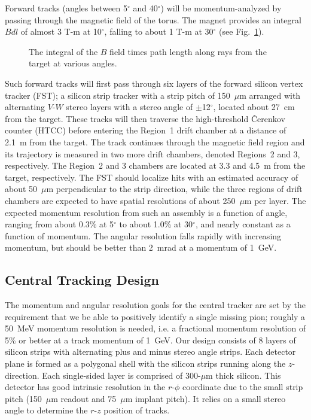 Forward tracks (angles between 5$^\circ$ and 40$^\circ$) will be 
momentum-analyzed by passing through the magnetic field of the torus.  The 
magnet provides an integral $Bdl$ of almost 3 T-m at 10$^\circ$, falling
to about 1 T-m at 30$^\circ$ (see Fig.~\ref{bdl}).

\begin{figure}[htbp]
\vspace{6.8cm}
\caption{\small{The integral of the $B$ field times path length along rays 
from the target at various angles.}}
\label{bdl}
\end{figure}

Such forward tracks will first pass through six layers of the forward silicon 
vertex tracker (FST); a silicon strip tracker with a strip pitch of 
150~$\mu$m arranged with alternating $V$-$W$ stereo layers with a stereo angle 
of $\pm$12$^\circ$, located about 27~cm from the target.  These tracks will 
then traverse the high-threshold {\v C}erenkov counter (HTCC) before 
entering the Region~1 drift chamber at a distance of 2.1~m from the target.  
The track continues through the magnetic field region and its trajectory is 
measured in two more drift chambers, denoted Regions~2 and 3, respectively.  
The Region~2 and 3 chambers are located at 3.3 and 4.5~m from the target,
respectively.  The FST should localize hits with an estimated accuracy of 
about 50~$\mu$m perpendicular to the strip direction, while the three regions 
of drift chambers are expected to have spatial resolutions of about
250~$\mu$m per layer.  The expected momentum resolution from such an assembly 
is a function of angle, ranging from about 0.3\% at 5$^\circ$ to about 1.0\% 
at 30$^\circ$, and nearly constant as a function of momentum.  The angular 
resolution falls rapidly with increasing momentum, but should be better than 
2~mrad at a momentum of 1~GeV.

\subsection{Central Tracking Design}

The momentum and angular resolution goals for the central tracker are set by 
the requirement that we be able to positively identify a single missing pion; 
roughly a 50~MeV momentum resolution is needed, i.e. a fractional momentum 
resolution of 5\% or better at a track momentum of 1~GeV.  Our design consists 
of 8 layers of silicon strips with alternating plus and minus stereo angle 
strips.  Each detector plane is formed as a polygonal shell with the silicon
strips running along the $z$-direction.  Each single-sided layer is comprised 
of 300-$\mu$m thick silicon.  This detector has good intrinsic resolution in 
the $r$-$\phi$ coordinate due to the small strip pitch (150~$\mu$m readout and 
75~$\mu$m implant pitch). It relies on a small stereo angle to determine the 
$r$-$z$ position of tracks.  

